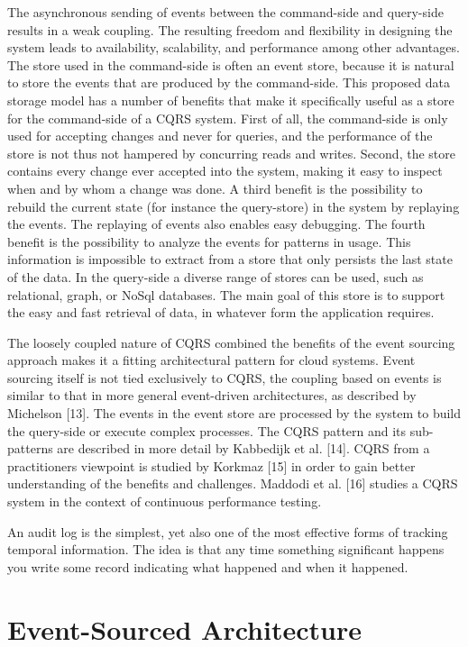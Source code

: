 The asynchronous sending of events between the command-side and query-side results in a weak coupling. The resulting freedom and flexibility in designing the system leads to availability, scalability, and performance among other advantages. The store used in the command-side is often an event store, because it is natural to store the events that are produced by the command-side. This proposed data storage model has a number of benefits that make it specifically useful as a store for the command-side of a CQRS system. First of all, the command-side is only used for accepting changes and never for queries, and the performance of the store is not thus not hampered by concurring reads and writes. Second, the store contains every change ever accepted into the system, making it easy to inspect when and by whom a change was done. A third benefit is the possibility to rebuild the current state (for instance the query-store) in the system by replaying the events. The replaying of events also enables easy debugging. The fourth benefit is the possibility to analyze the events for patterns in usage. This information is impossible to extract from a store that only persists the last state of the data. In the query-side a diverse range of stores can be used, such as relational, graph, or NoSql databases. The main goal of this store is to support the easy and fast retrieval of data, in whatever form the application requires.

The loosely coupled nature of CQRS combined the benefits of the event sourcing approach makes it a fitting architectural pattern for cloud systems. Event sourcing itself is not tied exclusively to CQRS, the coupling based on events is similar to that in more general event-driven architectures, as described by Michelson [13]. The events in the event store are processed by the system to build the query-side or execute complex processes. The CQRS pattern and its sub-patterns are described in more detail by Kabbedijk et al. [14]. CQRS from a practitioners viewpoint is studied by Korkmaz [15] in order to gain better understanding of the benefits and challenges. Maddodi et al. [16] studies a CQRS system in the context of continuous performance testing.

An audit log is the simplest, yet also one of the most effective forms of tracking temporal information. The idea is that any time something significant happens you write some record indicating what happened and when it happened.

\section{Event-Sourced Architecture}

